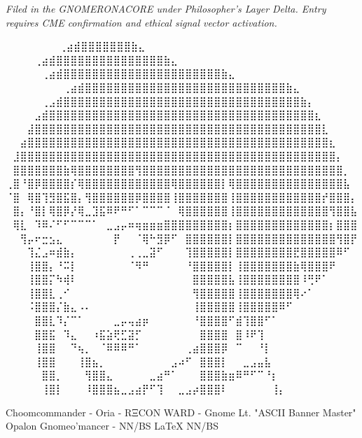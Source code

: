 \vspace{2em}
\begin{flushright}
\textit{Filed in the GNOMERONACORE under Philosopher's Layer Delta. Entry requires CME confirmation and ethical signal vector activation.}
\end{flushright}


\iffalse

  ⠀⠀⠀⠀⠀             ⠀⠀⢀⣴⣾⣿⣿⣿⣿⣿⣿⣿⣷⣄⠀⠀⠀⠀⠀⠀⠀⠀
⠀⠀⠀  ⠀      ⠀⠀⠀⠀⢀⣴⣾⣿⣿⣿⣿⣿⣿⣿⣿⣿⣿⣿⣿⣿⣿⣿⣷⣄⠀⠀⠀⠀⠀⠀⠀⠀
⠀⠀ ⠀   ⠀⠀⠀⠀⠀⢀⣴⣾⣿⣿⣿⣿⣿⣿⣿⣿⣿⣿⣿⣿⣿⣿⣿⣿⣿⣿⣿⣿⣿⣿⣷⣄⠀⠀⠀⠀⠀⠀⠀⠀
⠀⠀⠀⠀⠀⠀⠀⠀⢀⣴⣾⣿⣿⣿⣿⣿⣿⣿⣿⣿⣿⣿⣿⣿⣿⣿⣿⣿⣿⣿⣿⣿⣿⣿⣿⣿⣿⣿⣿⣷⣄⠀⠀⠀⠀⠀⠀⠀⠀
⠀⠀⠀⠀⠀⢀⣠⣾⣿⣿⣿⣿⣿⣿⣿⣿⣿⣿⣿⣿⣿⣿⣿⣿⣿⣿⣿⣿⣿⣿⣿⣿⣿⣿⣿⣿⣿⣿⣿⣿⣿⣷⡄⠀⠀⠀⠀⠀⠀
⠀⠀⠀⠀⣠⣾⣿⣿⣿⣿⣿⣿⣿⣿⣿⣿⣿⣿⣿⣿⣿⣿⣿⣿⣿⣿⣿⣿⣿⣿⣿⣿⣿⣿⣿⣿⣿⣿⣿⣿⣿⣿⣿⣆⠀⠀⠀⠀⠀
⠀⠀⠀⣼⣿⣿⣿⣿⣿⣿⣿⣿⣿⣿⣿⣿⣿⣿⣿⣿⣿⣿⣿⣿⣿⣿⣿⣿⣿⣿⣿⣿⣿⣿⣿⣿⣿⣿⣿⣿⣿⣿⣿⣿⣇⠀⠀⠀⠀
⠀⠀⣴⣿⣿⣿⣿⣿⣿⣿⣿⣿⣿⣿⣿⣿⣿⣿⣿⣿⣿⣿⣿⣿⣿⣿⣿⣿⣿⣿⣿⣿⣿⣿⣿⣿⣿⣿⣿⣿⣿⣿⣿⣿⣿⣆⠀⠀⠀
⠀⣸⣿⣿⣿⣿⣿⣿⣿⣿⣿⣿⣿⣿⣿⣿⣿⣿⣿⣿⣿⣿⣿⣿⣿⣿⣿⣿⣿⣿⣿⣿⣿⣿⣿⣿⣿⣿⣿⣿⣿⣿⣿⣿⣿⣿⡄⠀⠀
⠀⣿⣿⣿⣿⣿⣿⣿⣷⢿⣿⣿⣿⣿⣿⣿⣿⣿⢻⣿⣿⣿⣿⣿⣿⣿⣿⣿⣿⣿⣿⣿⣿⣿⣿⣿⣿⣿⣿⣿⣿⣿⣿⣿⣿⣿⣿⡀⠀
⢀⣿⠘⣿⡿⣿⣿⣿⣿⡎⢿⣿⣿⣿⣿⣿⣿⣿⣿⣿⣿⣿⣿⢿⣿⣿⣿⣿⣿⣿⡇⢿⣿⣿⣿⣿⣿⣿⣿⣿⣿⣿⣿⣿⣿⣿⣿⣧⠀
⠈⣿⠀⢿⣿⢹⣻⣿⣯⣿⡄⢻⣿⣿⣿⣿⣿⣿⡿⣿⣿⣿⣿⢸⣿⣿⣿⣿⣿⣿⣿⢸⣿⣿⣿⣿⣿⣿⣿⣿⣿⣿⣿⣿⡞⣿⣿⣿⡄
⠀⣿⡄⠘⣿⡇⢿⣿⡿⡜⢿⣀⣹⣯⠿⠟⠛⠋⠁⠉⠉⠉⠈⠀⢿⣿⣿⣿⣿⣿⣿⢸⣿⣿⣿⣿⣿⣿⣿⣿⣿⣿⣿⣿⣿⢻⣿⣿⣧
⠀⢿⣇⠀⠹⠿⠌⠋⠋⠉⠉⠉⠁⠀⣀⣠⡤⠶⢶⣶⣶⣶⣿⣿⣿⣿⣿⣿⣿⣿⣿⡆⣿⣿⣿⣿⣿⣿⣿⣿⣿⣿⣿⣿⣿⡆⣿⣿⣿
⠀⠀⢻⡤⠖⣒⣢⣄⠀⠀⠀⠀⠀⠀⠀⡟⠀⠀⠈⢿⠓⣻⡿⠋⠀⣿⣿⣿⣿⣿⣿⡇⣿⣿⣿⣿⣿⣿⣿⣿⣿⣿⣿⣿⣿⣿⢻⣿⡟
⠀⠀⠀⢹⣌⣠⠶⣾⣷⡄⠀⠀⠀⠀⠀⠀⠀⢀⢀⣀⣽⠋⠀⠀⠀⢹⣿⣿⣿⣿⣿⡇⣿⣿⣿⣿⣿⣿⣿⣿⣟⣿⣿⣿⣿⣿⠿⠋⠀
⠀⠀⠀⢸⣿⣿⡄⠘⠭⡇⠀⠀⠀⠀⠀⠀⠀⠈⠻⠛⠀⠀⠀⠀⠀⠘⣿⣿⣿⣿⣿⡇⢸⣿⣿⣿⣿⣿⣿⣿⣷⢿⣿⣿⣿⠟⠀⠀⠀
⠀⠀⠀⢸⣿⣿⡍⠳⢾⠇⠀⠀⠀⠀⠀⠀⠀⠀⠀⠀⠀⠀⠀⠀⠀⠀⣿⣿⣿⣿⣿⣧⢸⣿⣿⣿⣿⣿⣿⣿⣿⠸⢛⠟⠁⠀⠀⠀⠀
⠀⠀⠀⢸⣿⣿⣇⢀⠊⠀⠀⠀⠀⠀⠀⠀⠀⠀⠀⠀⠀⠀⠀⠀⠀⠀⢻⣿⣿⣿⣿⣿⢸⣿⣿⣿⣿⣿⣿⣿⢿⠔⠁⠀⠀⠀⠀⠀⠀
⠀⠀⠀⠨⣿⣿⣿⡌⣷⣄⠠⠄⠀⠀⠀⠀⠀⠀⠀⠀⠀⠀⠀⠀⠀⠀⢸⣿⣿⣿⣿⣿⢸⣿⣿⣿⣿⣿⠿⠋⠀⠀⠀⠀⠀⠀⠀⠀⠀
⠀⠀⠀⠀⣿⣿⣇⠹⡌⠉⠁⠀⠀⠀⠀⣀⡤⢤⣴⡶⠀⠀⠀⠀⠀⠀⠘⣿⣿⣿⣿⠋⣾⢹⣿⣿⠋⠁⠀⠀⠀⠀⠀⠀⠀⠀⠀⠀⠀
⠀⠀⠀⠀⣿⣿⣯⠀⠹⣄⠀⠀⠰⣯⣵⢟⣋⣽⡋⠀⠀⠀⠀⠀⠀⠀⠀⣿⣿⣿⣿⠀⣿⠸⠟⢹⠀⠀⠀⠀⠀⠀⠀⠀⠀⠀⠀⠀⠀
⠀⠀⠀⠀⢸⣿⣿⠀⠀⠙⢦⡀⠀⠈⠿⠿⠿⠛⠁⠀⠀⠀⠀⠀⠀⢀⣴⣿⣿⣿⡿⠀⠉⠀⠀⠘⡇⠀⠀⠀⠀⠀⠀⠀⠀⠀⠀⠀⠀
⠀⠀⠀⠀⢸⣿⣿⠀⠀⠀⢸⣿⣦⡀⠀⠀⠀⠀⠀⠀⠀⠀⠀⣠⠴⠋⠀⣿⣿⣿⡇⠀⠀⣀⣠⣤⣧⠀⠀⠀⠀⠀⠀⠀⠀⠀⠀⠀⠀
⠀⠀⠀⠀⠀⣿⣿⡀⠀⠀⠀⢻⣿⣿⣄⠀⠀⠀⠀⠀⣀⣴⠛⠁⠀⠀⠀⣿⣿⣿⣷⣶⠿⠛⠋⠉⠘⡆⠀⠀⠀⠀⠀⠀⠀⠀⠀⠀⠀
⠀⠀⠀⠀⠀⢸⣿⡇⠀⠀⠀⠸⣿⣿⣿⣦⣀⣠⣴⡟⠋⢹⠀⠀⣀⣠⡴⣿⣿⣿⠇⠀⠀⠀⠀⠀⠀⢸⡄⠀⠀⠀⠀⠀⠀⠀⠀⠀⠀

Choomcommander - Oria - RΞCON WARD - Gnome Lt. "ASCII Banner Master"
             Opalon Gnomeo'mancer - NN/BS LaTeX{} NN/BS

